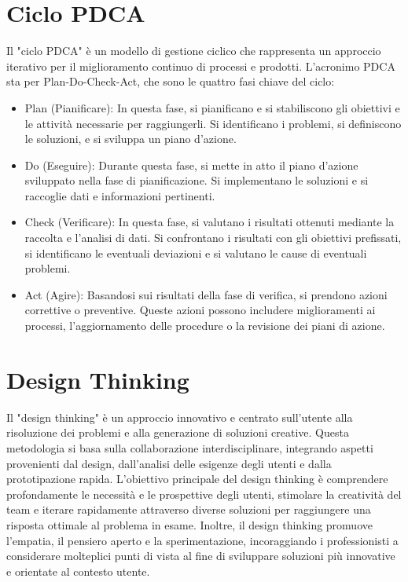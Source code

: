 \documentclass{article}
\begin{document}
\section{Ciclo PDCA}
 Il "ciclo PDCA" è un modello di gestione ciclico che rappresenta un approccio iterativo per il miglioramento continuo di processi e prodotti. L'acronimo PDCA sta per Plan-Do-Check-Act, che sono le quattro fasi chiave del ciclo:
\begin{itemize}
    \item Plan (Pianificare): In questa fase, si pianificano e si stabiliscono gli obiettivi e le attività necessarie per raggiungerli. Si identificano i problemi, si definiscono le soluzioni, e si sviluppa un piano d'azione.
    \item Do (Eseguire): Durante questa fase, si mette in atto il piano d'azione sviluppato nella fase di pianificazione. Si implementano le soluzioni e si raccoglie dati e informazioni pertinenti.
    \item Check (Verificare): In questa fase, si valutano i risultati ottenuti mediante la raccolta e l'analisi di dati. Si confrontano i risultati con gli obiettivi prefissati, si identificano le eventuali deviazioni e si valutano le cause di eventuali problemi.
    \item Act (Agire): Basandosi sui risultati della fase di verifica, si prendono azioni correttive o preventive. Queste azioni possono includere miglioramenti ai processi, l'aggiornamento delle procedure o la revisione dei piani di azione.
\end{itemize}

\section{Design Thinking}
Il "design thinking" è un approccio innovativo e centrato sull'utente alla risoluzione dei problemi e alla generazione di soluzioni creative. Questa metodologia si basa sulla collaborazione interdisciplinare, integrando aspetti provenienti dal design, dall'analisi delle esigenze degli utenti e dalla prototipazione rapida. L'obiettivo principale del design thinking è comprendere profondamente le necessità e le prospettive degli utenti, stimolare la creatività del team e iterare rapidamente attraverso diverse soluzioni per raggiungere una risposta ottimale al problema in esame. Inoltre, il design thinking promuove l'empatia, il pensiero aperto e la sperimentazione, incoraggiando i professionisti a considerare molteplici punti di vista al fine di sviluppare soluzioni più innovative e orientate al contesto utente.
\end{document}
